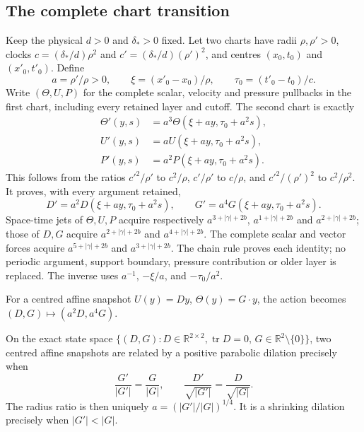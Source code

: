 \subsection{The complete chart transition}

Keep the physical $d>0$ and $\delta_*>0$ fixed.  Let two charts have
radii $\rho,\rho'>0$, clocks $c=(\delta_*/d)\rho^2$ and
$c'=(\delta_*/d)(\rho')^2$, and centres $(x_0,t_0)$ and
$(x'_0,t'_0)$.  Define
\[
 a=\rho'/\rho>0,\qquad
 \xi=(x'_0-x_0)/\rho,\qquad \tau_0=(t'_0-t_0)/c.
\]
Write $(\Theta,U,P)$ for the complete scalar, velocity and pressure
pullbacks in the first chart, including every retained layer and
cutoff.  The second chart is exactly
\begin{equation}\label{cvlane:irc:full-chart}
 \begin{aligned}
 \Theta'(y,s)&=a^3\Theta(\xi+ay,\tau_0+a^2s),\\
 U'(y,s)&=aU(\xi+ay,\tau_0+a^2s),\\
 P'(y,s)&=a^2P(\xi+ay,\tau_0+a^2s).
 \end{aligned}
\end{equation}
This follows from the ratios $c'^2/\rho'$ to $c^2/\rho$,
$c'/\rho'$ to $c/\rho$, and $c'^2/(\rho')^2$ to $c^2/\rho^2$.
It proves, with every argument retained,
\begin{equation}\label{cvlane:irc:gradient-chart}
 D'=a^2D(\xi+ay,\tau_0+a^2s),\qquad
 G'=a^4G(\xi+ay,\tau_0+a^2s).
\end{equation}
Space-time jets of $\Theta,U,P$ acquire respectively
$a^{3+|\gamma|+2b}$, $a^{1+|\gamma|+2b}$ and
$a^{2+|\gamma|+2b}$; those of $D,G$ acquire
$a^{2+|\gamma|+2b}$ and $a^{4+|\gamma|+2b}$.
The complete scalar and vector forces acquire
$a^{5+|\gamma|+2b}$ and $a^{3+|\gamma|+2b}$.
The chain rule proves each identity; no periodic argument, support
boundary, pressure contribution or older layer is replaced.
The inverse uses $a^{-1}$, $-\xi/a$, and $-\tau_0/a^2$.

For a centred affine snapshot $U(y)=Dy$, $\Theta(y)=G\cdot y$,
the action becomes $(D,G)\mapsto(a^2D,a^4G)$.

\begin{cvlaneproposition}\label{cvlane:irc:orbit-classification}
On the exact state space
$\{(D,G):D\in\mathbb R^{2\times2},\operatorname{tr}D=0,\,
G\in\mathbb R^2\setminus\{0\}\}$, two centred affine snapshots are
related by a positive parabolic dilation precisely when
\begin{equation}\label{cvlane:irc:complete-invariants}
 \frac{G'}{|G'|}=\frac G{|G|},\qquad
 \frac{D'}{\sqrt{|G'|}}=\frac D{\sqrt{|G|}}.
\end{equation}
The radius ratio is then uniquely
$a=(|G'|/|G|)^{1/4}$.  It is a shrinking dilation precisely when
$|G'|<|G|$.
\end{cvlaneproposition}

